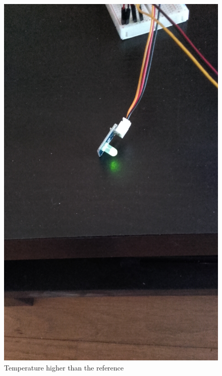 \documentclass[10pt]{article}
\begin{document}
\begin{figure}[H]
  \centering
  \includegraphics[width=\textwidth]{../imgs/highTemperature.jpg}
  \caption{\label{highTemp}Temperature higher than the reference}
\end{figure}
\end{document}
